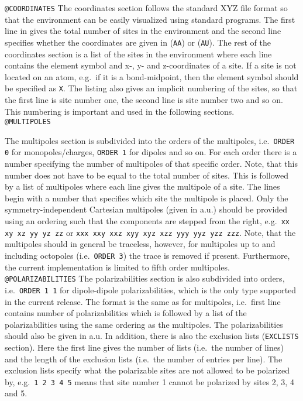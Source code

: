 \noindent\texttt{@COORDINATES}\newline
The coordinates section follows the standard XYZ file format so that the 
environment can be easily visualized using standard programs. The first line in 
gives the total number of sites in the environment and the second line 
specifies whether the coordinates are given in \angstrom{} (\verb|AA|) or 
\bohr{} (\verb|AU|). The rest of the coordinates section is a list of the sites in 
the environment where each line contains the element symbol and x-, y- and 
z-coordinates of a site. If a site is not located on an atom, e.g.\ if it is a 
bond-midpoint, then the element symbol should be specified as \verb|X|. The 
listing also gives an implicit numbering of the sites, so that the first line 
is site number one, the second line is site number two and so on. This 
numbering is important and used in the following sections.\\

\noindent\texttt{@MULTIPOLES}\newline

The multipoles section is subdivided into the orders of the
multipoles, i.e.\ \verb|ORDER 0| for monopoles/charges, \verb|ORDER 1|
for dipoles and so on.  For each order there is a number specifying
the number of multipoles of that specific order. Note, that this
number does not have to be equal to the total number of sites. This is
followed by a list of multipoles where each line gives the multipole
of a site. The lines begin with a number that specifies which site the
multipole is placed. Only the symmetry-independent Cartesian
multipoles (given in a.u.) should be provided using an ordering such
that the components are stepped from the right, e.g.\
\verb|xx xy xz yy yz zz| or \verb|xxx xxy xxz xyy xyz xzz yyy yyz yzz zzz|.
Note, that the multipoles should in general be traceless, however, for
multipoles up to and including octopoles (i.e.\ \verb|ORDER 3|) the
trace is removed if present. Furthermore,
the current implementation is limited to fifth order multipoles.\\

\noindent\texttt{@POLARIZABILITIES}\newline
The polarizabilities section is also subdivided into orders,
i.e.\ \verb|ORDER 1 1| for dipole-dipole polarizabilities, which is the only 
type supported in the current release. The format is the same as for 
multipoles, i.e.\ first line contains number of polarizabilities which is 
followed by a list of the polarizabilities using the same ordering as the 
multipoles. The polarizabilities should also be given in a.u. In addition, 
there is also the exclusion lists (\verb|EXCLISTS| 
section). Here the first line gives the number of lists (i.e.\ the number of 
lines) and the length of the exclusion lists (i.e.\ the number of entries per 
line). The exclusion lists specify what the polarizable sites are not allowed 
to be polarized by, e.g.\ \verb|1 2 3 4 5| means that site number 1 cannot be 
polarized by sites 2, 3, 4 and 5.

